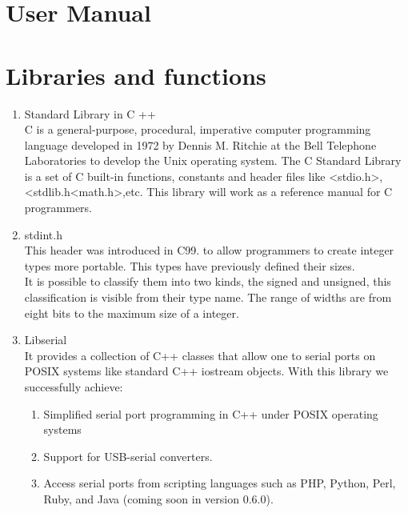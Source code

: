\documentclass[twocolumn]{IEEEtran}
\begin{document}
\section{User Manual}



\section{Libraries and functions}

	\begin{enumerate}
    
    	\item Standard Library in C ++ \\
        C is a general-purpose, procedural, imperative computer programming 
        language developed in 1972 by Dennis M. Ritchie at the Bell Telephone 
        Laboratories to develop the Unix operating system. The C Standard 
        Library is a set of C built-in functions, constants and header files  
        like <stdio.h>, <stdlib.h<math.h>,etc. This library will work as a
        reference manual for C programmers.\cite{6}\cite{18} \\
    
        \item stdint.h\\
        This header was introduced in C99. to allow programmers to create integer 
        types more portable. This types have previously defined their sizes.\\ It is 
        possible to classify them into two kinds, the signed and unsigned, this 
        classification is visible from their type name. The range of widths are from 
        eight bits to the maximum size of a integer.\cite{8}\\
    
        \item Libserial\\
        It provides a collection of C++ classes that allow one to serial ports on 
        POSIX systems like standard C++ iostream objects. With this library we 
        successfully achieve:
        \begin{enumerate}
        \item Simplified serial port programming in C++ under POSIX operating systems\
        \item Support for USB-serial converters.\
        \item Access serial ports from scripting languages such as 									
        PHP, Python, Perl, Ruby, and Java (coming soon in version 0.6.0).\
		\end{enumerate}
            

\end{enumerate}
\end{document}
